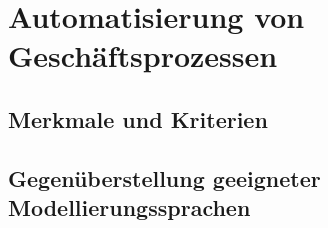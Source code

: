 \section{Automatisierung von Geschäftsprozessen}

\subsection{Merkmale und Kriterien}

\subsection{Gegenüberstellung geeigneter Modellierungssprachen}
